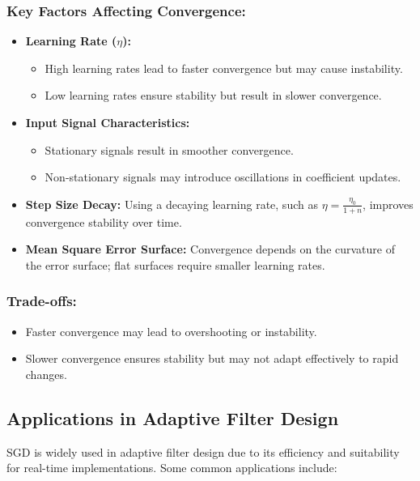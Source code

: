 \documentclass[hidelinks,12pt]{article}
\begin{document}
	\subsubsection*{Key Factors Affecting Convergence:}
	\begin{itemize}
		\item \textbf{Learning Rate (\( \eta \)):}
		\begin{itemize}
			\item High learning rates lead to faster convergence but may cause instability.
			\item Low learning rates ensure stability but result in slower convergence.
		\end{itemize}
		\item \textbf{Input Signal Characteristics:}
		\begin{itemize}
			\item Stationary signals result in smoother convergence.
			\item Non-stationary signals may introduce oscillations in coefficient updates.
		\end{itemize}
		\item \textbf{Step Size Decay:} Using a decaying learning rate, such as \( \eta = \frac{\eta_0}{1+n} \), improves convergence stability over time.
		\item \textbf{Mean Square Error Surface:} Convergence depends on the curvature of the error surface; flat surfaces require smaller learning rates.
	\end{itemize}
	
	\subsubsection*{Trade-offs:}
	\begin{itemize}
		\item Faster convergence may lead to overshooting or instability.
		\item Slower convergence ensures stability but may not adapt effectively to rapid changes.
	\end{itemize}
	
	\subsection*{Applications in Adaptive Filter Design}
	SGD is widely used in adaptive filter design due to its efficiency and suitability for real-time implementations. Some common applications include:
	
\end{document}
